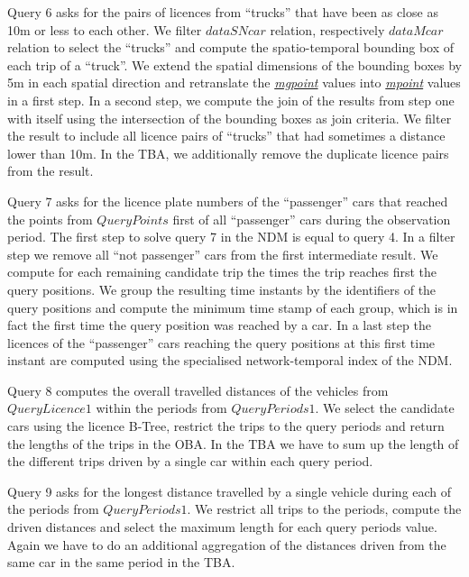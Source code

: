 \documentclass[a4paper]{article}
\newcommand{\dt}[1]{\textsl{\underline{#1}}}
\begin{document}
{Query 6 asks for the pairs of licences from ``trucks'' that have been as close as
10m or less to each other. We filter $dataSNcar$ relation, respectively $dataMcar$
relation to select the ``trucks'' and compute the spatio-temporal bounding box
of each trip of a ``truck''. We extend the spatial dimensions of the bounding boxes
by 5m in each spatial direction and retranslate the \dt{mgpoint} values into \dt{mpoint}
values in a first step. In a second step, we compute the join of the results from
step one with itself using the intersection of the bounding boxes as join criteria.
We filter the result to include all licence pairs of ``trucks'' that had sometimes
a distance lower than 10m. In the TBA, we additionally remove the duplicate licence
pairs from the result.

Query 7 asks for the licence plate numbers of the ``passenger'' cars that reached
the points from $QueryPoints$ first of all ``passenger'' cars during the
observation period. The first step to solve query 7 in the NDM is
equal to query 4. In a filter step we remove all ``not passenger'' cars from the
first intermediate result. We compute for each remaining candidate trip the times
the trip reaches first the query positions. We group the resulting time instants
by the identifiers of the query positions and compute the minimum time stamp of
each group, which is in fact the first time the query position was reached by a
car. In a last step the licences of the ``passenger'' cars reaching the query
positions at this first time instant are computed using the specialised
network-temporal index of the NDM.

Query 8 computes the overall travelled distances of the vehicles from $QueryLicence1$
within the periods from $QueryPeriods1$. We select the candidate cars using the
licence B-Tree, restrict the trips to the query periods and return the lengths of the
trips in the OBA. In the TBA we have to sum up the length of the different
trips driven by a single car within each query period.

Query 9 asks for the longest distance travelled by a single vehicle during each
of the periods from $QueryPeriods1$. We restrict all trips to the periods, compute
the driven distances and select the maximum length for each query periods value.
Again we have to do an additional aggregation of the distances driven from the same
car in the same period in the TBA.

}
\end{document}
